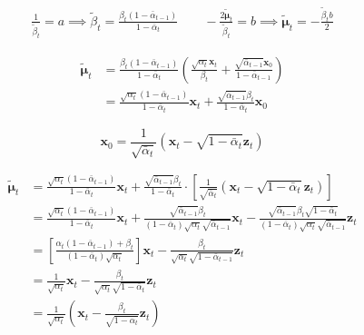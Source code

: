 \documentclass[a4paper, 11pt]{article}
\begin{document}
\begin{gather*}
    \frac{1}{\tilde{\beta}_t} = a \implies \tilde{\beta}_t = \frac{\beta_t(1 - \bar{\alpha}_{t-1})}{1 - \bar{\alpha}_t} \qquad
    -\frac{2\tilde{\boldsymbol{\mu}}_t}{\tilde{\beta}_t} = b \implies \tilde{\boldsymbol{\mu}}_t = -\frac{\tilde{\beta}_t b}{2}
\end{gather*}

\begin{align*}
    \tilde{\boldsymbol{\mu}}_t &= \frac{\beta_t(1 - \bar{\alpha}_{t-1})}{1 - \bar{\alpha}_t} \left( \frac{\sqrt{\alpha_t}\mathbf{x}_t}{\beta_t} + \frac{\sqrt{\bar{\alpha}_{t-1}}\mathbf{x}_0}{1 - \bar{\alpha}_{t-1}} \right) \\[12pt]
    &= \frac{\sqrt{\alpha_t}(1 - \bar{\alpha}_{t-1})}{1 - \bar{\alpha}_t}\mathbf{x}_t + \frac{\sqrt{\bar{\alpha}_{t-1}}\beta_t}{1 - \bar{\alpha}_t}\mathbf{x}_0
\end{align*}

\begin{equation*}
    \mathbf{x}_0 = \frac{1}{\sqrt{\bar{\alpha}_t}}\left(\mathbf{x}_t - \sqrt{1 - \bar{\alpha}_t}\mathbf{z}_t\right)
\end{equation*}

\begin{align*}
    \tilde{\boldsymbol{\mu}}_t &= \frac{\sqrt{\alpha_t}(1 - \bar{\alpha}_{t-1})}{1 - \bar{\alpha}_t}\mathbf{x}_t + \frac{\sqrt{\bar{\alpha}_{t-1}}\beta_t}{1 - \bar{\alpha}_t} \cdot \left[ \frac{1}{\sqrt{\bar{\alpha}_t}}\left(\mathbf{x}_t - \sqrt{1 - \bar{\alpha}_t}\mathbf{z}_t\right) \right] \\[12pt]
    &= \frac{\sqrt{\alpha_t}(1 - \bar{\alpha}_{t-1})}{1 - \bar{\alpha}_t}\mathbf{x}_t + \frac{\sqrt{\bar{\alpha}_{t-1}}\beta_t}{(1 - \bar{\alpha}_t)\sqrt{\alpha_t}\sqrt{\bar{\alpha}_{t-1}}}\mathbf{x}_t - \frac{\sqrt{\bar{\alpha}_{t-1}}\beta_t \sqrt{1 - \bar{\alpha}_t}}{(1 - \bar{\alpha}_t)\sqrt{\alpha_t}\sqrt{\bar{\alpha}_{t-1}}}\mathbf{z}_t \\[12pt]
    &= \left[ \frac{\alpha_t(1 - \bar{\alpha}_{t-1}) + \beta_t}{(1 - \bar{\alpha}_t)\sqrt{\alpha_t}} \right] \mathbf{x}_t - \frac{\beta_t}{\sqrt{\alpha_t}\sqrt{1 - \bar{\alpha}_{t-1}}}\mathbf{z}_t \\[12pt]
    &= \frac{1}{\sqrt{\alpha_t}}\mathbf{x}_t - \frac{\beta_t}{\sqrt{\alpha_t}\sqrt{1 - \bar{\alpha}_t}}\mathbf{z}_t \\[12pt]
    &= \frac{1}{\sqrt{\alpha_t}}\left(\mathbf{x}_t - \frac{\beta_t}{\sqrt{1 - \bar{\alpha}_t}}\mathbf{z}_t\right)
\end{align*}
\end{document}
